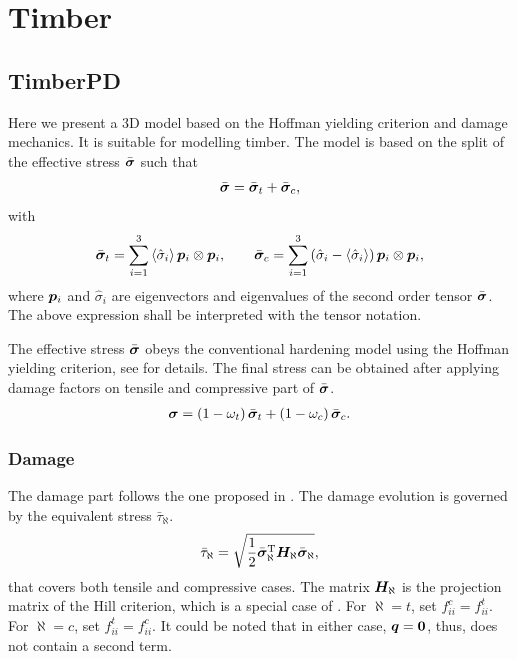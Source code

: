 \chapter{Timber}
\section{TimberPD}
Here we present a 3D model based on the Hoffman yielding criterion and damage mechanics. It is suitable for modelling timber. The model is based on the split of the effective stress $\bar{\bm{\sigma}}$ such that
\begin{gather}
\bar{\bm{\sigma}}=\bar{\bm{\sigma}}_t+\bar{\bm{\sigma}}_c,
\end{gather}
with
\begin{gather}
\bar{\bm{\sigma}}_t=\sum_{i=1}^{3}\left\langle\hat{\sigma}_i\right\rangle\bm{p}_i\otimes\bm{p}_i,\qquad
\bar{\bm{\sigma}}_c=\sum_{i=1}^{3}\left(\hat{\sigma}_i-\left\langle\hat{\sigma}_i\right\rangle\right)\bm{p}_i\otimes\bm{p}_i,
\end{gather}
where $\bm{p}_i$ and $\hat{\sigma}_i$ are eigenvectors and eigenvalues of the second order tensor $\bar{\bm{\sigma}}$. The above expression shall be interpreted with the tensor notation.

The effective stress $\bar{\bm{\sigma}}$ obeys the conventional hardening model using the Hoffman yielding criterion, see  for details. The final stress can be obtained after applying damage factors on tensile and compressive part of $\bar{\bm{\sigma}}$.
\begin{gather}
\bm{\sigma}=\left(1-\omega_t\right)\bar{\bm{\sigma}}_t+\left(1-\omega_c\right)\bar{\bm{\sigma}}_c.
\end{gather}
\subsection{Damage}
The damage part follows the one proposed in \cite{SirumbalZapata2018}. The damage evolution is governed by the equivalent stress $\bar{\tau}_{\aleph}$.
\begin{gather}\label{eq:timber_damage}
\bar{\tau}_{\aleph}=\sqrt{\dfrac{1}{2}\bar{\bm{\sigma}}_\aleph^{\mathrm{T}}\bm{H}_\aleph\bar{\bm{\sigma}}_\aleph},
\end{gather}
that covers both tensile and compressive cases. The matrix $\bm{H}_\aleph$ is the projection matrix of the Hill criterion, which is a special case of . For $\aleph=t$, set $f_{ii}^c=f_{ii}^t$. For $\aleph=c$, set $f_{ii}^t=f_{ii}^c$. It could be noted that in either case, $\bm{q}=\bm{0}$, thus,  does not contain a second term.

